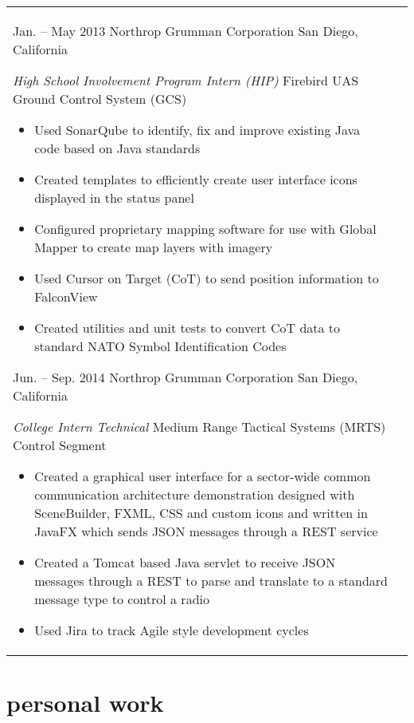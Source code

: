\documentclass[print]{friggeri-cv} %
\makeatletter
\renewenvironment{entrylist}{%
	\par\begin{tabular*}{\textwidth}{@{\extracolsep{\fill}}ll}
	}{%
\end{tabular*}\par
}
\makeatother
\begin{document}
\begin{entrylist}
\entry
{Jan. -- May 2013}
{Northrop Grumman Corporation}
{San Diego, California}
{\emph{High School Involvement Program Intern (HIP)}
Firebird UAS Ground Control System (GCS)
\begin{itemize}
\item Used SonarQube to identify, fix and improve existing Java code based on Java standards
\item Created templates to efficiently create user interface icons displayed in the status panel
\item Configured proprietary mapping software for use with Global Mapper to create map layers with imagery
\item Used Cursor on Target (CoT) to send position information to FalconView
\item Created utilities and unit tests to convert CoT data to standard NATO Symbol Identification Codes
\end{itemize}}
\entry
{Jun. -- Sep. 2014}
{Northrop Grumman Corporation}
{San Diego, California}
{\emph{College Intern Technical}
Medium Range Tactical Systems (MRTS)  Control Segment
\begin{itemize}
\item Created a graphical user interface for a sector-wide common communication architecture demonstration designed with SceneBuilder, FXML, CSS and custom icons and written in JavaFX which sends JSON messages through a REST service
\item Created a Tomcat based Java servlet to receive JSON messages through a REST to parse and translate to a standard message type to control a radio
\item Used Jira to track Agile style development cycles
\end{itemize}}
\end{entrylist}


\section{personal work}
\end{document}
